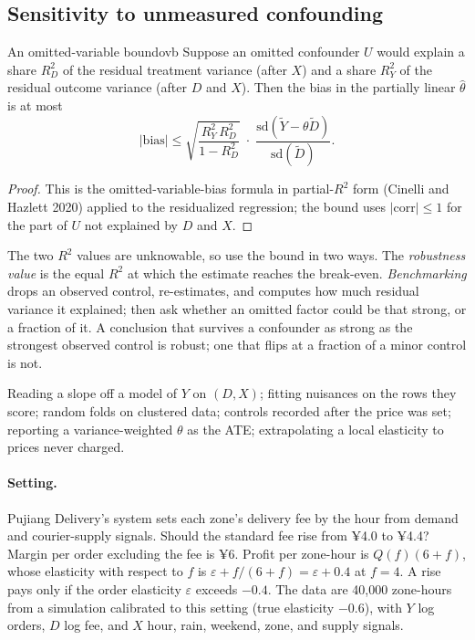 \documentclass[11pt]{article}
\begin{document}
\subsection{Sensitivity to unmeasured confounding}

\begin{prop}{An omitted-variable bound}{ovb}
Suppose an omitted confounder $U$ would explain a share $R^2_{D}$ of the residual treatment variance (after $X$) and a share $R^2_{Y}$ of
the residual outcome variance (after $D$ and $X$). Then the bias in the partially linear $\hat\theta$ is at most
\[
  |\text{bias}| \le \sqrt{\frac{R^2_{Y}\,R^2_{D}}{1 - R^2_{D}}}\;\cdot\;\frac{\text{sd}(\tilde Y - \theta\tilde D)}{\text{sd}(\tilde D)} .
\]
\end{prop}
\begin{proof}
This is the omitted-variable-bias formula in partial-$R^2$ form (Cinelli and Hazlett 2020) applied to the residualized regression; the
bound uses $|\text{corr}| \le 1$ for the part of $U$ not explained by $D$ and $X$.
\end{proof}

The two $R^2$ values are unknowable, so use the bound in two ways. The \emph{robustness value} is the equal $R^2$ at which the
estimate reaches the break-even. \emph{Benchmarking} drops an observed control, re-estimates, and computes how much residual variance
it explained; then ask whether an omitted factor could be that strong, or a fraction of it. A conclusion that survives a confounder as strong as the
strongest observed control is robust; one that flips at a fraction of a minor control is not.

\begin{pitfall}
Reading a slope off a model of $Y$ on $(D, X)$; fitting nuisances on the rows they score; random folds on clustered data; controls
recorded after the price was set; reporting a variance-weighted $\theta$ as the ATE; extrapolating a local elasticity to prices never
charged.
\end{pitfall}

\sectiontwo

\paragraph{Setting.} Pujiang Delivery's system sets each zone's delivery fee by the hour from demand and courier-supply signals. Should the
standard fee rise from ¥4.0 to ¥4.4? Margin per order excluding the fee is ¥6. Profit per zone-hour is $Q(f)(6 + f)$, whose elasticity
with respect to $f$ is $\varepsilon + f/(6 + f) = \varepsilon + 0.4$ at $f = 4$. A rise pays only if the order elasticity $\varepsilon$ exceeds $-0.4$.
The data are 40{,}000 zone-hours from a simulation calibrated to this setting (true elasticity $-0.6$), with $Y$ log orders, $D$ log fee, and $X$ hour, rain, weekend, zone, and supply signals.
\end{document}
